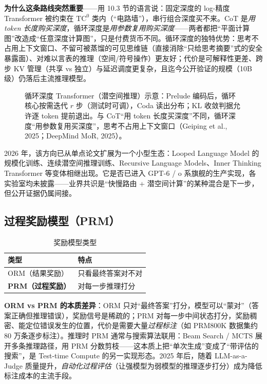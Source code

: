 \documentclass[12pt,a4paper]{article}
\begin{document}
\textbf{为什么这条路线突然重要}——用 10.3 节的语言说：固定深度的 log-精度 Transformer 被约束在 $\mathrm{TC}^0$ 类内（“电路墙”），串行组合深度买不来。CoT 是\emph{用 token 长度购买深度}，循环深度是\emph{用参数复用购买深度}——两者都把“平面计算图”改造成“任意深度计算图”，只是付费货币不同。循环深度的独特优势：思考不占用上下文窗口、不留可被蒸馏的可见思维链（直接消除“只给思考摘要”式的安全暴露面）、对难以言表的推理（空间/符号操作）更友好；代价是可解释性更差、跨步 KV 管理（共享 vs 独立）与延迟调度更复杂，且迄今公开验证的规模（10B 级）仍落后主流推理模型。

\begin{figure}[htbp]
\centering
\resizebox{0.97\textwidth}{!}{%

}%
\caption{循环深度 Transformer（潜空间推理）示意：Prelude 编码后，循环核心按需迭代 $r$ 步（测试时可调），Coda 读出分布；KL 收敛判据允许逐 token 提前退出。与 CoT“用 token 长度买深度”不同，循环深度“用参数复用买深度”，思考不占用上下文窗口（Geiping et al., 2025；DeepMind MoR, 2025）。}
\label{fig:recdepth}
\end{figure}

2026 年，该方向已从单点论文扩展为一个小型生态：Looped Language Model 的规模化训练、连续潜空间推理训练、Recursive Language Models、Inner Thinking Transformer 等变体相继出现。它是否已进入 GPT-6 / o 系旗舰的生产实现，各实验室均未披露——业界共识是“快慢路由 + 潜空间计算”的某种混合是下一步，但公开证据仍属间接。

\subsection{过程奖励模型（PRM）}

\begin{table}[htbp]
\centering
\small
\begin{tabular}{@{}ll@{}}
\toprule
\textbf{类型} & \textbf{特点}\\
\midrule
ORM（结果奖励） & 只看最终答案对不对\\
\textbf{PRM（过程奖励）} & 对每一步推理打分\\
\bottomrule
\end{tabular}
\caption{奖励模型类型}
\end{table}

\textbf{ORM vs PRM 的本质差异}：ORM 只对“最终答案”打分，模型可以“蒙对”（答案正确但推理错误），奖励信号是稀疏的；PRM 对每一步中间状态打分，奖励稠密、能定位错误发生的位置，代价是需要大量\emph{过程标注}（如 PRM800K 数据集约 80 万条逐步标注）。推理时 PRM 通常与搜索算法联用：Beam Search / MCTS 展开多条推理路径，用 PRM 分数剪枝——这本质上把“单次生成”变成了“带评估的搜索”，是 Test-time Compute 的另一实现形态。2025 年后，随着 LLM-as-a-Judge 质量提升，\emph{自动化过程评估}（让强模型为弱模型的推理逐步打分）成为降低标注成本的主流手段。
\end{document}
